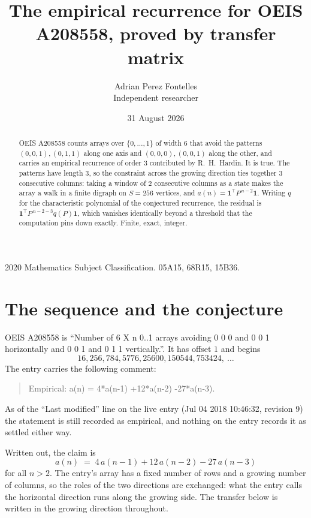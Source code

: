 \documentclass[11pt,a4paper]{article}
\title{The empirical recurrence for OEIS A208558, proved by transfer matrix}
\author{Adrian Perez Fontelles\\ \small Independent researcher}
\date{31 August 2026}
\theoremstyle{plain}
\theoremstyle{definition}
\begin{document}
\maketitle

\begin{abstract}
OEIS A208558 counts arrays over $\{0,\dots,1\}$ of width $6$ that avoid the patterns
$(0,0,1), (0,1,1)$ along one axis and $(0,0,0), (0,0,1)$ along the other, and carries an empirical recurrence of
order $3$ contributed by R.~H.~Hardin. It is true. The patterns have length $3$, so
the constraint across the growing direction ties together $3$ consecutive columns: taking a
window of $2$ consecutive columns as a state makes the array a walk in a finite digraph
on $S=256$ vertices, and $a(n)=\mathbf{1}^{\!\top}P^{\,n-2}\mathbf{1}$. Writing $q$
for the characteristic polynomial of the conjectured recurrence, the residual is
$\mathbf{1}^{\!\top}P^{\,n-2-3}q(P)\mathbf{1}$, which vanishes identically
beyond a threshold that the computation pins down exactly. Finite, exact, integer.
\end{abstract}

\noindent\small 2020 Mathematics Subject Classification. 05A15, 68R15, 15B36.\normalsize

\section{The sequence and the conjecture}

OEIS A208558 is ``Number of 6 X n 0..1 arrays avoiding 0 0 0 and 0 0 1 horizontally and 0 0 1 and 0 1 1 vertically.''. It has offset
$1$ and begins
\[
16, 256, 784, 5776, 25600, 150544, 753424,\ \dots
\]
The entry carries the following comment:
\begin{quote}\small
Empirical: a(n) = 4*a(n-1) +12*a(n-2) -27*a(n-3).
\end{quote}
As of the ``Last modified'' line on the live entry (Jul 04 2018 10:46:32, revision
9) the statement is still recorded as empirical, and nothing on the entry
records it as settled either way.

Written out, the claim is
\begin{equation}\label{eq:conj}
a(n)\;=\;4\,a(n-1) + 12\,a(n-2) - 27\,a(n-3)
\end{equation}
for all $n>2$. The entry's array has a fixed number of rows and a growing number of
columns, so the roles of the two directions are exchanged: what the entry calls the
horizontal direction runs along the growing side. The transfer below is written in the
growing direction throughout.
\end{document}
